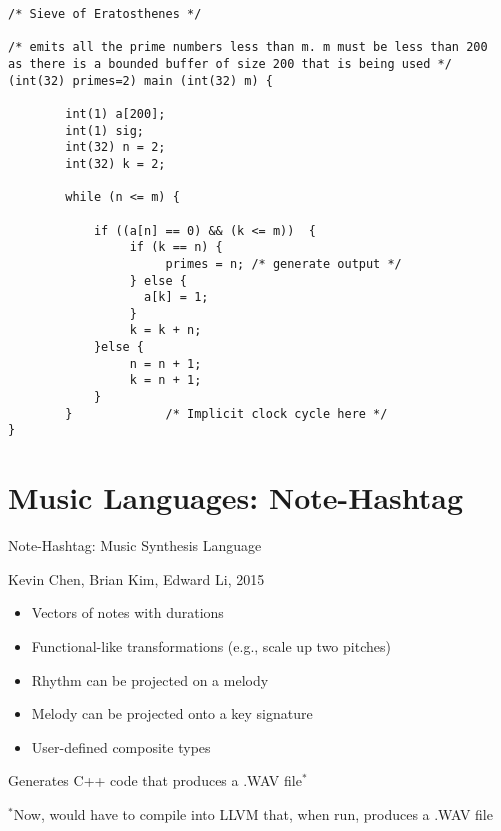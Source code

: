 \documentclass{plt}
\begin{document}
\begin{frame}[fragile]
\fontsize{8pt}{8pt}\selectfont
\begin{verbatim}
/* Sieve of Eratosthenes */

/* emits all the prime numbers less than m. m must be less than 200
as there is a bounded buffer of size 200 that is being used */
(int(32) primes=2) main (int(32) m) { 
        
        int(1) a[200]; 
        int(1) sig; 
        int(32) n = 2;
        int(32) k = 2;
         
        while (n <= m) {
              
            if ((a[n] == 0) && (k <= m))  {
                 if (k == n) {   
                      primes = n; /* generate output */
                 } else { 
                   a[k] = 1; 
                 } 
                 k = k + n;    
            }else {
                 n = n + 1;
                 k = n + 1;                   
            }         
        }             /* Implicit clock cycle here */
}
\end{verbatim}
\end{frame}

\section{Music Languages: Note-Hashtag}

\begin{frame}{Note-Hashtag: Music Synthesis Language}

Kevin Chen, Brian Kim, Edward Li, 2015

\begin{itemize}
\item Vectors of notes with durations
\item Functional-like transformations (e.g., scale up two pitches)
\item Rhythm can be projected on a melody
\item Melody can be projected onto a key signature
\item User-defined composite types
\end{itemize}

Generates C++ code that produces a .WAV file$^*$

$^*$Now, would have to compile into LLVM that, when run, produces a .WAV file

\end{frame}
\end{document}
